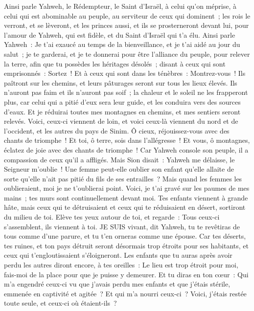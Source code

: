 \begin{multicols}{2}
Ainsi parle Yahweh, le Rédempteur, le Saint d'Israël, à celui qu'on méprise, à celui qui est abominable au peuple, au serviteur de ceux qui dominent~; les rois le verront, et se lèveront, et les princes aussi, et ils se prosterneront devant lui, pour l'amour de Yahweh, qui est fidèle, et du Saint d'Israël qui t'a élu.
Ainsi parle Yahweh~: Je t'ai exaucé au temps de la bienveillance, et je t'ai aidé au jour du salut~; je te garderai, et je te donnerai pour être l'alliance du peuple, pour relever la terre, afin que tu possèdes les héritages désolés~;
disant à ceux qui sont emprisonnés~: Sortez~! Et à ceux qui sont dans les ténèbres~: Montrez-vous~! Ils paîtront sur les chemins, et leurs pâturages seront sur tous les lieux élevés.
Ils n'auront pas faim et ils n'auront pas soif~; la chaleur et le soleil ne les frapperont plus, car celui qui a pitié d'eux sera leur guide, et les conduira vers des sources d'eaux.
Et je réduirai toutes mes montagnes en chemins, et mes sentiers seront relevés.
Voici, ceux-ci viennent de loin, et voici ceux-là viennent du nord et de l'occident, et les autres du pays de Sinim.
Ô cieux, réjouissez-vous avec des chants de triomphe~! Et toi, ô terre, sois dans l'allégresse~! Et vous, ô montagnes, éclatez de joie avec des chants de triomphe~! Car Yahweh console son peuple, il a compassion de ceux qu'il a affligés.
Mais Sion disait~: Yahweh me délaisse, le Seigneur m'oublie~!
Une femme peut-elle oublier son enfant qu'elle allaite de sorte qu'elle n'ait pas pitié du fils de ses entrailles~? Mais quand les femmes les oublieraient, moi je ne t'oublierai point.
Voici, je t'ai gravé sur les paumes de mes mains~; tes murs sont continuellement devant moi.
Tes enfants viennent à grande hâte, mais ceux qui te détruisaient et ceux qui te réduisaient en désert, sortiront du milieu de toi.
Elève tes yeux autour de toi, et regarde~: Tous ceux-ci s'assemblent, ils viennent à toi. JE SUIS vivant, dit Yahweh, tu te revêtiras de tous comme d'une parure, et tu t'en orneras comme une épouse.
Car tes déserts, tes ruines, et ton pays détruit seront désormais trop étroits pour ses habitants, et ceux qui t'engloutissaient s'éloigneront.
Les enfants que tu auras après avoir perdu les autres diront encore, à tes oreilles~: Le lieu est trop étroit pour moi, fais-moi de la place pour que je puisse y demeurer.
Et tu diras en ton cœur~: Qui m'a engendré ceux-ci vu que j'avais perdu mes enfants et que j'étais stérile, emmenée en captivité et agitée~? Et qui m'a nourri ceux-ci~? Voici, j'étais restée toute seule, et ceux-ci où étaient-ils~?

\end{multicols}
